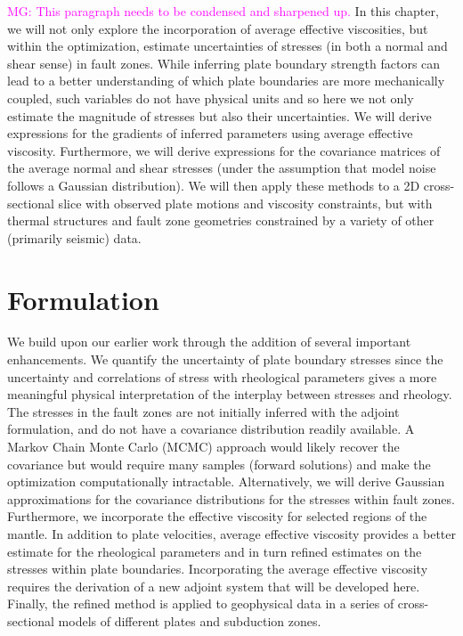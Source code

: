 \documentclass[12pt]{article}
\newcommand{\mgnote}[1]{\textcolor{magenta}{MG: #1}}
\begin{document}
\mgnote{This paragraph needs to be condensed and sharpened up.} In this chapter, we will not only explore the incorporation of average effective viscosities, but within the optimization, estimate uncertainties of stresses (in both a normal and shear sense) in fault zones. While inferring plate boundary strength factors \citep{ratnaswamy2015adjoint} can lead to a better understanding of which plate boundaries are more mechanically coupled, such variables do not have physical units and so here we not only estimate the magnitude of  stresses but also their uncertainties. We will derive expressions for the gradients of inferred parameters using average effective viscosity. Furthermore, we will derive expressions for the covariance matrices of the average normal and shear stresses (under the assumption that model noise follows a Gaussian distribution). We will then apply these methods to a 2D cross-sectional slice with observed plate motions and viscosity constraints, but with thermal structures and fault zone geometries constrained by a variety of other (primarily seismic) data.
 


\section{Formulation}
We build upon our earlier work \citep{ratnaswamy2015adjoint} through the addition of several important enhancements. We quantify the uncertainty of plate boundary stresses since the uncertainty and correlations of stress with rheological parameters gives a more meaningful physical interpretation of the interplay between stresses and rheology. The stresses in the fault zones are not initially inferred with the adjoint formulation, and do not have a covariance distribution readily available. A Markov Chain Monte Carlo (MCMC) approach would likely recover the covariance but would require many samples (forward solutions) and make the optimization computationally intractable. Alternatively, we will derive Gaussian approximations for the covariance distributions for the stresses within fault zones.
Furthermore, we incorporate the effective viscosity for selected regions of the mantle. 
In addition to plate velocities, average effective viscosity provides a better estimate for the rheological parameters and in turn refined estimates on the stresses within plate boundaries. Incorporating the average effective viscosity requires the derivation of a new adjoint system that will be developed here. 
Finally, the refined method is applied to geophysical data in a series of cross-sectional models of different plates and subduction zones.
\end{document}
